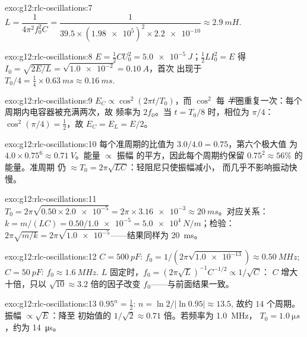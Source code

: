\begin{solution}{exo:g12:rlc-oscillations:7}
$L = \dfrac{1}{4\pi^2 f_0^2 C} = \dfrac{1}{39.5 \times
(\num{1.98e5})^2 \times \num{2.2e-10}} \approx \qty{2.9}{mH}$.
\end{solution}

\begin{solution}{exo:g12:rlc-oscillations:8}
$E = \tfrac12 CU_0^2 = \qty{5.0e-5}{J}$；$\tfrac12 LI_0^2 = E$ 得
$I_0 = \sqrt{2E/L} = \sqrt{\num{1.0e-2}} = \qty{0.10}{A}$，首次
出现于 $T_0/4 = \tfrac14 \times \qty{0.63}{ms} \approx
\qty{0.16}{ms}$.
\end{solution}

\begin{solution}{exo:g12:rlc-oscillations:9}
$E_C \propto \cos^2(2\pi t/T_0)$，而 $\cos^2$ 每
\emph{半}圈重复一次：每个周期内电容器被充满两次，故
频率为 $2f_0$。当 $t = T_0/8$ 时，相位为 $\pi/4$：
$\cos^2(\pi/4) = \tfrac12$，故 $E_C = E_L = E/2$。
\end{solution}

\begin{solution}{exo:g12:rlc-oscillations:10}
每个准周期的比值为 $3.0/4.0 = 0.75$，第六个极大值
为 $4.0 \times 0.75^6 \approx \qty{0.71}{V}$。能量 $\propto$ 振幅
的平方，因此每个周期约保留 $0.75^2 \approx 56\%$ 的能量。准周期
仍 $\approx T_0 = 2\pi\sqrt{LC}$：轻阻尼只使振幅减小，
而几乎不影响振动快慢。
\end{solution}

\begin{solution}{exo:g12:rlc-oscillations:11}
$T_0 = 2\pi\sqrt{0.50 \times \num{2.0e-5}} = 2\pi \times
\num{3.16e-3} \approx \qty{20}{ms}$。对应关系：$k = m/(LC) =
0.50/\num{1.0e-5} = \qty{5.0e4}{N/m}$；检验：
$2\pi\sqrt{m/k} = 2\pi\sqrt{\num{1.0e-5}}$——结果同样为 \qty{20}{ms}。
\end{solution}

\begin{solution}{exo:g12:rlc-oscillations:12}
$C = \qty{500}{pF}$: $f_0 = 1/(2\pi\sqrt{\num{1.0e-13}}) \approx
\qty{0.50}{MHz}$; $C = \qty{50}{pF}$: $f_0 \approx \qty{1.6}{MHz}$.
$L$ 固定时，$f_0 = (2\pi\sqrt{L})^{-1} C^{-1/2} \propto 1/\sqrt{C}$：
$C$ 增大十倍，只以 $\sqrt{10} \approx 3.2$ 倍的因子改变 $f_0$——与前面结果一致。
\end{solution}

\begin{solution}{exo:g12:rlc-oscillations:13}
$0.95^n = \tfrac12$: $n = \ln 2/\lvert\ln 0.95\rvert \approx 13.5$,
故约 $14$ 个周期。振幅 $\propto \sqrt{E}$：降至
初始值的 $1/\sqrt{2} \approx 0.71$ 倍。若频率为 \qty{1.0}{MHz}，
$T_0 = \qty{1.0}{\micro s}$，约为 \qty{14}{\micro s}。
\end{solution}

